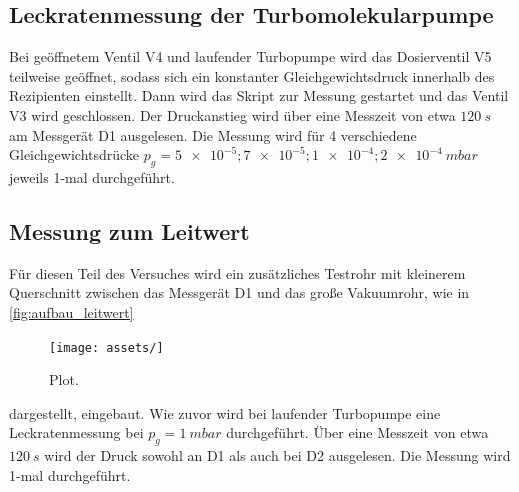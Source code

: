 \subsection{Leckratenmessung der Turbomolekularpumpe}
Bei geöffnetem Ventil V4 und laufender Turbopumpe wird das Dosierventil V5 teilweise geöffnet, sodass sich ein konstanter Gleichgewichtsdruck innerhalb des Rezipienten einstellt.
Dann wird das Skript zur Messung gestartet und das Ventil V3 wird geschlossen. Der Druckanstieg wird über eine Messzeit von etwa $\SI{120}{s}$ am Messgerät D1 ausgelesen.
Die Messung wird für 4 verschiedene Gleichgewichtsdrücke $p_{\mathit{g}} = \num{5e-5}; \num{7e-5}; \num{1e-4}; \SI{2e-4}{mbar}$ jeweils 1-mal durchgeführt.

\subsection{Messung zum Leitwert}
Für diesen Teil des Versuches wird ein zusätzliches Testrohr mit kleinerem Querschnitt zwischen das Messgerät D1 und das große Vakuumrohr, wie in \autoref{fig:aufbau_leitwert}
\begin{figure}
  \centering
  \texttt{[image: assets/]}
  \caption{Plot.}
  \label{fig:plot}
\end{figure}
dargestellt, eingebaut. Wie zuvor wird bei laufender Turbopumpe eine Leckratenmessung bei $p_{\mathit{g}} = \SI{1}{mbar}$ durchgeführt. Über eine Messzeit von etwa $\SI{120}{s}$
wird der Druck sowohl an D1 als auch bei D2 ausgelesen. Die Messung wird 1-mal durchgeführt.